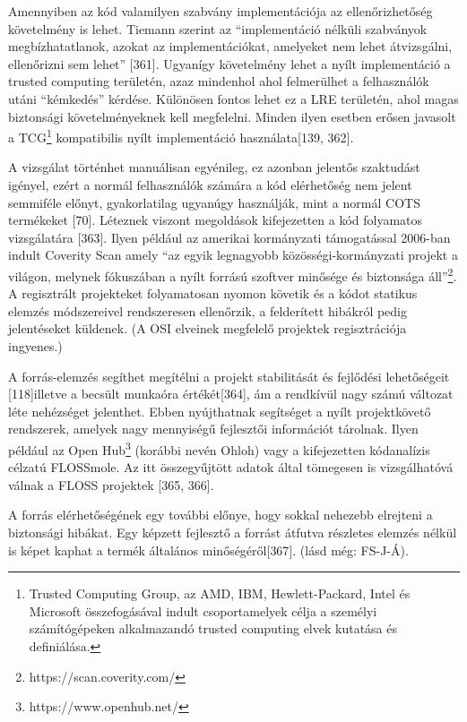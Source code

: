 \documentclass[12pt,magyar,a4paper,oneside]{scrreprt}
\begin{document}
Amennyiben az kód valamilyen szabvány implementációja az
ellenőrizhetőség követelmény is lehet. Tiemann szerint az
``implementáció nélküli szabványok megbízhatatlanok, azokat az
implementációkat, amelyeket nem lehet átvizsgálni, ellenőrizni sem
lehet'' {[}361{]}. Ugyanígy követelmény lehet a nyílt implementáció a
trusted computing területén, azaz mindenhol ahol felmerülhet a
felhasználók utáni ``kémkedés'' kérdése. Különösen fontos lehet ez a LRE
területén, ahol magas biztonsági követelményeknek kell megfelelni.
Minden ilyen esetben erősen javasolt a TCG\footnote{Trusted Computing
  Group, az AMD, IBM, Hewlett-Packard, Intel és Microsoft összefogásával
  indult csoportamelyek célja a személyi számítógépeken alkalmazandó
  trusted computing elvek kutatása és definiálása.} kompatibilis nyílt
implementáció használata{[}139, 362{]}.

A vizsgálat történhet manuálisan egyénileg, ez azonban jelentős
szaktudást igényel, ezért a normál felhasználók számára a kód
elérhetőség nem jelent semmiféle előnyt, gyakorlatilag ugyanúgy
használják, mint a normál COTS termékeket {[}70{]}. Léteznek viszont
megoldások kifejezetten a kód folyamatos vizsgálatára {[}363{]}. Ilyen
például az amerikai kormányzati támogatással 2006-ban indult Coverity
Scan amely ``az egyik legnagyobb közösségi-kormányzati projekt a
világon, melynek fókuszában a nyílt forrású szoftver minősége és
biztonsága áll''\footnote{https://scan.coverity.com/}. A regisztrált
projekteket folyamatosan nyomon követik és a kódot statikus elemzés
módszereivel rendszeresen ellenőrzik, a felderített hibákról pedig
jelentéseket küldenek. (A OSI elveinek megfelelő projektek
regisztrációja ingyenes.)

A forrás-elemzés segíthet megítélni a projekt stabilitását és fejlődési
lehetőségeit {[}118{]}illetve a becsült munkaóra értékét{[}364{]}, ám a
rendkívül nagy számú változat léte nehézséget jelenthet. Ebben
nyújthatnak segítséget a nyílt projektkövető rendszerek, amelyek nagy
mennyiségű fejlesztői információt tárolnak. Ilyen például az Open
Hub\footnote{https://www.openhub.net/} (korábbi nevén Ohloh) vagy a
kifejezetten kódanalízis célzatú FLOSSmole. Az itt összegyűjtött adatok
által tömegesen is vizsgálhatóvá válnak a FLOSS projektek {[}365,
366{]}.

A forrás elérhetőségének egy további előnye, hogy sokkal nehezebb
elrejteni a biztonsági hibákat. Egy képzett fejlesztő a forrást átfutva
részletes elemzés nélkül is képet kaphat a termék általános
minőségéről{[}367{]}. (lásd még: FS-J-Á).
\end{document}
